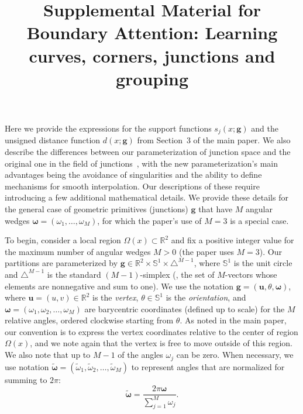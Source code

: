 \documentclass[main.tex]{subfiles}
\begin{document}
\title{\large Supplemental Material for Boundary Attention: Learning curves, corners, junctions and grouping}
\author{}
\institute{}

\maketitle

\setcounter{tocdepth}{2}
\tableofcontents


Here we provide the expressions for the support functions $s_{j}(x;\mathbf{g})$ and the unsigned distance function $d(x;\mathbf{g})$ from Section~3 of the main paper. We also describe the differences between our parameterization of junction space and the original one in the field of junctions~\cite{verbin2021field}, with the new parameterization's main advantages being the avoidance of singularities and the ability to define mechanisms for smooth interpolation. Our descriptions of these require introducing a few additional mathematical details. We provide these details for the general case of geometric primitives (junctions) $\mathbf{g}$ that have $M$ angular wedges $\boldsymbol{\omega}=(\omega_1,\ldots,\omega_M)$, for which the paper's use of $M=3$ is a special case.

To begin, consider a local region $\Omega(x)\subset\mathbb{R}^2$ and fix a positive integer value for the maximum number of angular wedges $M>0$ (the paper uses $M=3$). Our partitions are parameterized by $\mathbf{g}\in\mathbb{R}^2\times\mathbb{S}^1\times\triangle^{M-1}$, where $\mathbb{S}^1$ is the unit circle and $\triangle^{M-1}$ is the standard $(M-1)$-simplex (\ie, the set of $M$-vectors whose elements are nonnegative and sum to one). We use the notation $\mathbf{g}=(\boldsymbol{u}, \theta, \boldsymbol{\omega})$, where $\boldsymbol{u}=(u,v)\in \mathbb{R}^2$ is the \emph{vertex}, $\theta\in\mathbb{S}^1$ is the \emph{orientation}, and   $\boldsymbol{\omega}=(\omega_1,\omega_2,\ldots,\omega_M)$ are barycentric coordinates (defined up to scale) for the $M$ relative angles, ordered clockwise starting from $\theta$. As noted in the main paper, our convention is to express the vertex coordinates relative to the center of region $\Omega(x)$, and we note again that the vertex is free to move outside of this region. We also note that up to $M-1$ of the angles $\omega_j$ can be zero. When necessary, we use notation $\tilde{\boldsymbol{\omega}}=(\tilde\omega_1,\tilde\omega_2,\ldots,\tilde\omega_M)$ to represent angles that are normalized for summing to $2\pi$:
\begin{equation}\label{eq:normalized-wedges}
    \tilde{\boldsymbol{\omega}}=\frac{2\pi\boldsymbol{\omega}}{\sum_{j=1}^M\omega_j}.
\end{equation}
\end{document}

